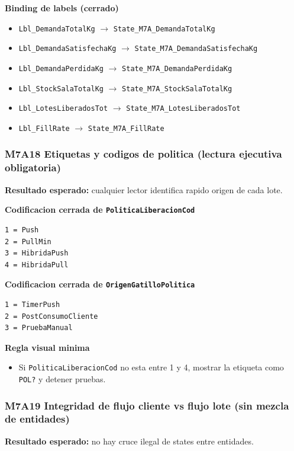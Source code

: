 \documentclass[11pt]{article}
\newcommand{\simio}[1]{\texttt{#1}}
\newcommand{\state}[1]{\texttt{#1}}
\begin{document}
\textbf{Binding de labels (cerrado)}
\begin{itemize}
  \item \simio{Lbl\_DemandaTotalKg} \(\rightarrow\) \state{State\_M7A\_DemandaTotalKg}
  \item \simio{Lbl\_DemandaSatisfechaKg} \(\rightarrow\) \state{State\_M7A\_DemandaSatisfechaKg}
  \item \simio{Lbl\_DemandaPerdidaKg} \(\rightarrow\) \state{State\_M7A\_DemandaPerdidaKg}
  \item \simio{Lbl\_StockSalaTotalKg} \(\rightarrow\) \state{State\_M7A\_StockSalaTotalKg}
  \item \simio{Lbl\_LotesLiberadosTot} \(\rightarrow\) \state{State\_M7A\_LotesLiberadosTot}
  \item \simio{Lbl\_FillRate} \(\rightarrow\) \state{State\_M7A\_FillRate}
\end{itemize}

\subsubsection{M7A18 Etiquetas y codigos de politica (lectura ejecutiva obligatoria)}
\textbf{Resultado esperado:} cualquier lector identifica rapido origen de cada lote.

\textbf{Codificacion cerrada de \state{PoliticaLiberacionCod}}
\begin{lstlisting}[caption={Diccionario de codigos de politica para panel y etiquetas}]
1 = Push
2 = PullMin
3 = HibridaPush
4 = HibridaPull
\end{lstlisting}

\textbf{Codificacion cerrada de \state{OrigenGatilloPolitica}}
\begin{lstlisting}[caption={Diccionario de origen de gatillo para trazabilidad}]
1 = TimerPush
2 = PostConsumoCliente
3 = PruebaManual
\end{lstlisting}

\textbf{Regla visual minima}
\begin{itemize}
  \item Si \state{PoliticaLiberacionCod} no esta entre 1 y 4, mostrar la etiqueta como \simio{POL?} y detener pruebas.
\end{itemize}

\subsubsection{M7A19 Integridad de flujo cliente vs flujo lote (sin mezcla de entidades)}
\textbf{Resultado esperado:} no hay cruce ilegal de states entre entidades.
\end{document}
